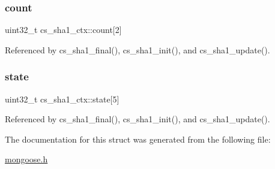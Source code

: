 \subsubsection{\texorpdfstring{count}{count}}
{\footnotesize\ttfamily uint32\+\_\+t cs\+\_\+sha1\+\_\+ctx\+::count\mbox{[}2\mbox{]}}



Referenced by cs\+\_\+sha1\+\_\+final(), cs\+\_\+sha1\+\_\+init(), and cs\+\_\+sha1\+\_\+update().

\mbox{\label{structcs__sha1__ctx_aaec67b16b157c16a771df82ec41220b0_aaec67b16b157c16a771df82ec41220b0}} 
\subsubsection{\texorpdfstring{state}{state}}
{\footnotesize\ttfamily uint32\+\_\+t cs\+\_\+sha1\+\_\+ctx\+::state\mbox{[}5\mbox{]}}



Referenced by cs\+\_\+sha1\+\_\+final(), cs\+\_\+sha1\+\_\+init(), and cs\+\_\+sha1\+\_\+update().



The documentation for this struct was generated from the following file\+:\begin{DoxyCompactItemize}
\item 
\hyperlink{mongoose_8h}{mongoose.\+h}\end{DoxyCompactItemize}
